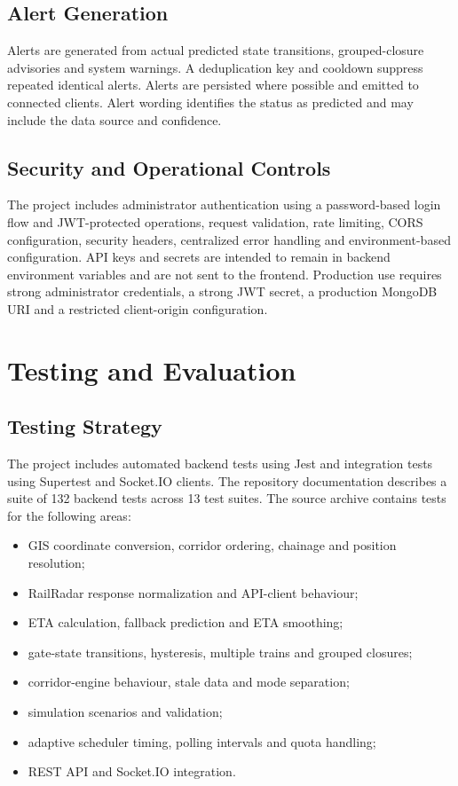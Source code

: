\documentclass[11pt,a4paper]{report}
\begin{document}
\section{Alert Generation}
Alerts are generated from actual predicted state transitions, grouped-closure advisories and system warnings. A deduplication key and cooldown suppress repeated identical alerts. Alerts are persisted where possible and emitted to connected clients. Alert wording identifies the status as predicted and may include the data source and confidence.

\section{Security and Operational Controls}
The project includes administrator authentication using a password-based login flow and JWT-protected operations, request validation, rate limiting, CORS configuration, security headers, centralized error handling and environment-based configuration. API keys and secrets are intended to remain in backend environment variables and are not sent to the frontend. Production use requires strong administrator credentials, a strong JWT secret, a production MongoDB URI and a restricted client-origin configuration.

\chapter{Testing and Evaluation}
\section{Testing Strategy}
The project includes automated backend tests using Jest and integration tests using Supertest and Socket.IO clients. The repository documentation describes a suite of 132 backend tests across 13 test suites. The source archive contains tests for the following areas:
\begin{itemize}
  \item GIS coordinate conversion, corridor ordering, chainage and position resolution;
  \item RailRadar response normalization and API-client behaviour;
  \item ETA calculation, fallback prediction and ETA smoothing;
  \item gate-state transitions, hysteresis, multiple trains and grouped closures;
  \item corridor-engine behaviour, stale data and mode separation;
  \item simulation scenarios and validation;
  \item adaptive scheduler timing, polling intervals and quota handling;
  \item REST API and Socket.IO integration.
\end{itemize}
\end{document}
